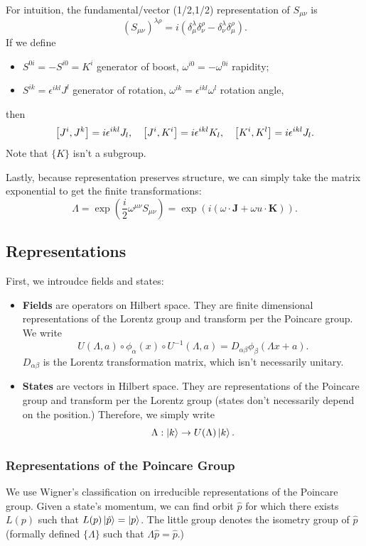 \documentclass{article}
\begin{document}
For intuition, the fundamental/vector (1/2,1/2) representation of $S_{\mu\nu}$ is
$$(S_{\mu\nu})^{\lambda\rho}=i(\delta^\lambda_\mu\delta^\rho_\nu-\delta^\lambda_\nu\delta^\rho_\mu).$$
If we define 
\begin{itemize}
    \item $S^{0i}=-S^{i0}=K^i$ generator of boost, $\omega^{i0}=-\omega^{0i}$ rapidity;
    \item $S^{ik}=\epsilon^{ikl}J^l$ generator of rotation, $\omega^{ik}=\epsilon^{ikl}\omega^l$ rotation angle,
\end{itemize}
then 
$$\comm{J^i}{J^k}=i\epsilon^{ikl}J_l,\quad\comm{J^i}{K^i}=i\epsilon^{ikl}K_l,\quad\comm{K^i}{K^l}=i\epsilon^{ikl}J_l.$$
Note that $\{K\}$ isn't a subgroup.

Lastly, because representation preserves structure, we can simply take the matrix exponential to get the finite transformations:
$$\Lambda=\exp\left(\frac i2\omega^{\mu\nu}S_{\mu\nu}\right)=\exp\left(i(\omega\cdot\mathbf J+\omega u\cdot\mathbf K)\right).$$

\subsection{Representations}
First, we introudce fields and states:
\begin{itemize}
    \item \textbf{Fields} are operators on Hilbert space. They are finite dimensional representations of the Lorentz group and transform per the Poincare group. We write
    $$U(\Lambda,a)\circ\phi_\alpha(x)\circ U^{-1}(\Lambda,a)=D_{\alpha\beta}\phi_\beta(\Lambda x+a).$$
    $D_{\alpha\beta}$ is the Lorentz transformation matrix, which isn't necessarily unitary.
    \item \textbf{States} are vectors in Hilbert space. They are representations of the Poincare group and transform per the Lorentz group (states don't necessarily depend on the position.) Therefore, we simply write 
    $$\Lambda:\ket k\to U(\Lambda)\ket k.$$
\end{itemize}

\subsubsection{Representations of the Poincare Group}

We use Wigner's classification on irreducible representations of the Poincare group. Given a state's momentum, we can find orbit $\hat p$ for which there exists $L(p)$ such that $L(p)\ket{\hat p}=\ket p$. The little group denotes the isometry group of $\hat p$ (formally defined $\{\Lambda\}$ such that $\Lambda\hat p=\hat p$.)
\end{document}
